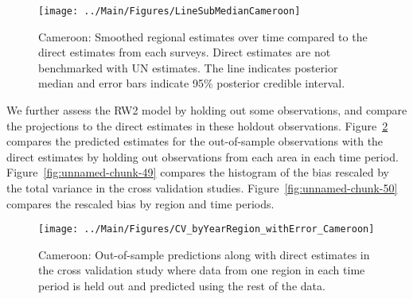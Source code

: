 \documentclass[12pt]{article}\usepackage[]{graphicx}\usepackage[]{color}
\newenvironment{knitrout}{}{} %
\begin{document}
\begin{knitrout}
\color{fgcolor}\begin{figure}[bht]

{\centering \texttt{[image: ../Main/Figures/LineSubMedianCameroon]} 

}

\caption[Cameroon]{Cameroon: Smoothed regional estimates over time compared to the direct estimates from each surveys. Direct estimates are not benchmarked with UN estimates. The line indicates posterior median and error bars indicate 95\% posterior credible interval.}\label{fig:unnamed-chunk-47}
\end{figure}


\end{knitrout}
We further assess the RW2 model by holding out some observations, and compare the projections to the direct estimates in these holdout observations. Figure~\ref{fig:unnamed-chunk-48} compares the predicted estimates for the out-of-sample observations  with the direct estimates by holding out observations from each area in each time period.  Figure~\ref{fig:unnamed-chunk-49} compares the histogram of the bias rescaled by the total variance in the cross validation studies. Figure~\ref{fig:unnamed-chunk-50} compares the rescaled bias by region and time periods.



 
\begin{knitrout}
\color{fgcolor}\begin{figure}[bht]

{\centering \texttt{[image: ../Main/Figures/CV\_byYearRegion\_withError\_Cameroon]} 

}

\caption[Cameroon]{Cameroon: Out-of-sample predictions along with direct estimates in the cross validation study where data from one region in each time period is held out and predicted using the rest of the data.}\label{fig:unnamed-chunk-48}
\end{figure}


\end{knitrout}
\end{document}

